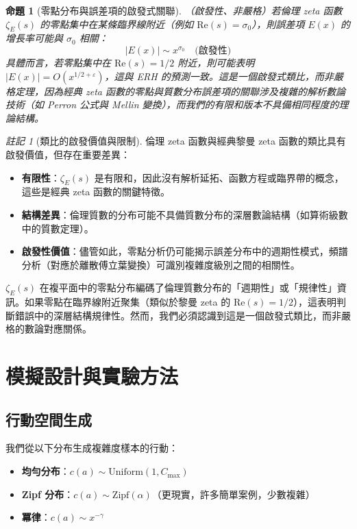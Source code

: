 \documentclass[12pt,a4paper]{article}
\newtheorem{proposition}[theorem]{命題}
\theoremstyle{definition}
\theoremstyle{remark}
\newtheorem{remark}[theorem]{註記}
\begin{document}
\begin{proposition}[零點分布與誤差項的啟發式關聯]
\label{prop:zeros_error_heuristic}
（啟發性、非嚴格）若倫理 zeta 函數 $\zeta_E(s)$ 的零點集中在某條臨界線附近（例如 $\text{Re}(s) = \sigma_0$），則誤差項 $E(x)$ 的增長率可能與 $\sigma_0$ 相關：
\[
|E(x)| \sim x^{\sigma_0} \quad \text{(啟發性)}
\]
具體而言，若零點集中在 $\text{Re}(s) = 1/2$ 附近，則可能表明 $|E(x)| = O(x^{1/2 + \varepsilon})$，這與 ERH 的預測一致。這是一個啟發式類比，而非嚴格定理，因為經典 zeta 函數的零點與質數分布誤差項的關聯涉及複雜的解析數論技術（如 Perron 公式與 Mellin 變換），而我們的有限和版本不具備相同程度的理論結構。
\end{proposition}

\begin{remark}[類比的啟發價值與限制]
倫理 zeta 函數與經典黎曼 zeta 函數的類比具有啟發價值，但存在重要差異：
\begin{itemize}
    \item \textbf{有限性}：$\zeta_E(s)$ 是有限和，因此沒有解析延拓、函數方程或臨界帶的概念，這些是經典 zeta 函數的關鍵特徵。
    \item \textbf{結構差異}：倫理質數的分布可能不具備質數分布的深層數論結構（如算術級數中的質數定理）。
    \item \textbf{啟發性價值}：儘管如此，零點分析仍可能揭示誤差分布中的週期性模式，頻譜分析（對應於離散傅立葉變換）可識別複雜度級別之間的相關性。
\end{itemize}
\end{remark}

$\zeta_E(s)$ 在複平面中的零點分布編碼了倫理質數分布的「週期性」或「規律性」資訊。如果零點在臨界線附近聚集（類似於黎曼 zeta 的 $\text{Re}(s) = 1/2$），這表明判斷錯誤中的深層結構規律性。然而，我們必須認識到這是一個啟發式類比，而非嚴格的數論對應關係。

\section{模擬設計與實驗方法}
\label{sec:framework}

\subsection{行動空間生成}

我們從以下分布生成複雜度樣本的行動：
\begin{itemize}
    \item \textbf{均勻分布}：$c(a) \sim \text{Uniform}(1, C_{\max})$
    \item \textbf{Zipf 分布}：$c(a) \sim \text{Zipf}(\alpha)$（更現實，許多簡單案例，少數複雜）
    \item \textbf{冪律}：$c(a) \sim x^{-\gamma}$
\end{itemize}
\end{document}
